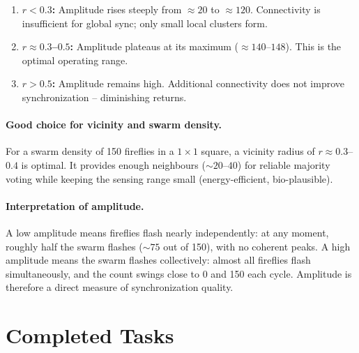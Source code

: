 \documentclass[12pt, a4paper]{article}
\begin{document}
\begin{enumerate}
    \item \textbf{$r < 0.3$:} Amplitude rises steeply from $\approx 20$ to
          $\approx 120$.  Connectivity is insufficient for global sync; only
          small local clusters form.
    \item \textbf{$r \approx 0.3$--$0.5$:} Amplitude plateaus at its maximum
          ($\approx 140$--$148$).  This is the optimal operating range.
    \item \textbf{$r > 0.5$:} Amplitude remains high.  Additional connectivity
          does not improve synchronization -- diminishing returns.
\end{enumerate}

\paragraph{Good choice for vicinity and swarm density.}
For a swarm density of 150 fireflies in a $1\times1$ square, a vicinity radius
of $r \approx 0.3$--$0.4$ is optimal.  It provides enough neighbours
(${\sim}20$--$40$) for reliable majority voting while keeping the sensing
range small (energy-efficient, bio-plausible).

\paragraph{Interpretation of amplitude.}
A low amplitude means fireflies flash nearly independently: at any
moment, roughly half the swarm flashes (${\sim}75$ out of 150), with no
coherent peaks.  A high amplitude means the swarm flashes
collectively: almost all fireflies flash simultaneously, and the count swings
close to 0 and 150 each cycle.  Amplitude is therefore a direct measure of
synchronization quality.

\newpage
\section{Completed Tasks}
\end{document}
